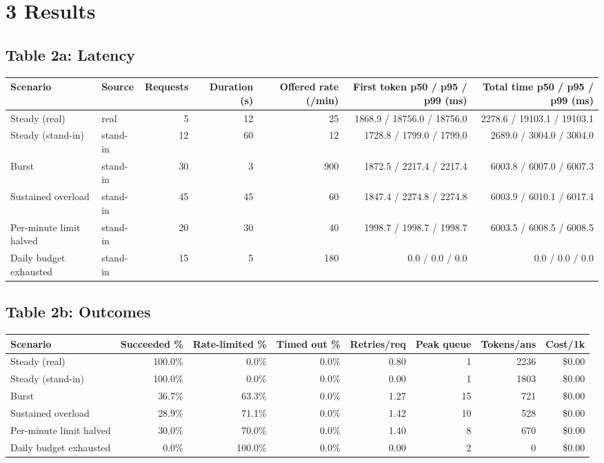\documentclass[9pt,a4paper]{article}
\begin{document}
\section*{3 Results}

\subsection*{Table 2a: Latency}
\noindent\begin{tabularx}{\textwidth}{l l r r r r r}
\toprule
\textbf{Scenario} & \textbf{Source} & \textbf{Requests} & \textbf{Duration (s)} & \textbf{Offered rate (/min)} & \textbf{First token p50 / p95 / p99 (ms)} & \textbf{Total time p50 / p95 / p99 (ms)} \\
\midrule
Steady (real) & real & 5 & 12 & 25 & 1868.9 / 18756.0 / 18756.0 & 2278.6 / 19103.1 / 19103.1 \\
Steady (stand-in) & stand-in & 12 & 60 & 12 & 1728.8 / 1799.0 / 1799.0 & 2689.0 / 3004.0 / 3004.0 \\
Burst & stand-in & 30 & 3 & 900 & 1872.5 / 2217.4 / 2217.4 & 6003.8 / 6007.0 / 6007.3 \\
Sustained overload & stand-in & 45 & 45 & 60 & 1847.4 / 2274.8 / 2274.8 & 6003.9 / 6010.1 / 6017.4 \\
Per-minute limit halved & stand-in & 20 & 30 & 40 & 1998.7 / 1998.7 / 1998.7 & 6003.5 / 6008.5 / 6008.5 \\
Daily budget exhausted & stand-in & 15 & 5 & 180 & 0.0 / 0.0 / 0.0 & 0.0 / 0.0 / 0.0 \\
\bottomrule
\end{tabularx}

\subsection*{Table 2b: Outcomes}
\noindent\begin{tabularx}{\textwidth}{l r r r r r r r}
\toprule
\textbf{Scenario} & \textbf{Succeeded \%} & \textbf{Rate-limited \%} & \textbf{Timed out \%} & \textbf{Retries/req} & \textbf{Peak queue} & \textbf{Tokens/ans} & \textbf{Cost/1k} \\
\midrule
Steady (real) & 100.0\% & 0.0\% & 0.0\% & 0.80 & 1 & 2236 & \$0.00 \\
Steady (stand-in) & 100.0\% & 0.0\% & 0.0\% & 0.00 & 1 & 1803 & \$0.00 \\
Burst & 36.7\% & 63.3\% & 0.0\% & 1.27 & 15 & 721 & \$0.00 \\
Sustained overload & 28.9\% & 71.1\% & 0.0\% & 1.42 & 10 & 528 & \$0.00 \\
Per-minute limit halved & 30.0\% & 70.0\% & 0.0\% & 1.40 & 8 & 670 & \$0.00 \\
Daily budget exhausted & 0.0\% & 100.0\% & 0.0\% & 0.00 & 2 & 0 & \$0.00 \\
\bottomrule
\end{tabularx}
\end{document}
